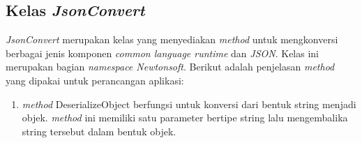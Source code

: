 \subsection{Kelas \textit{JsonConvert}}
\label{lab:Kelas JsonConvert}
\hspace{0.5cm} \textit{JsonConvert} merupakan kelas yang menyediakan \textit{method} untuk mengkonversi berbagai jenis komponen \textit{common language runtime} dan \textit{JSON}. Kelas ini merupakan bagian \textit{namespace Newtonsoft}.  Berikut adalah penjelasan \textit{method} yang dipakai untuk perancangan aplikasi:
\begin{enumerate}
	\item \textit{method} DeserializeObject berfungsi untuk konversi dari bentuk string menjadi objek. \textit{method} ini memiliki satu parameter bertipe string lalu mengembalika string tersebut dalam bentuk objek.
\end{enumerate}

